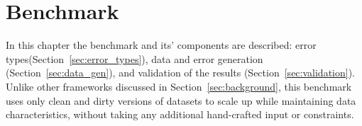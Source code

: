\chapter{Benchmark}
\label{sec:benchmark}
In this chapter the benchmark and its' components are described: error types(Section~\ref{sec:error_types}), data and error generation (Section~\ref{sec:data_gen}), and validation of the results (Section~\ref{sec:validation}).
Unlike other frameworks discussed in Section~\ref{sec:background}, this benchmark uses only clean and dirty versions of datasets to scale up while maintaining data characteristics, without taking any additional hand-crafted input or constraints.




